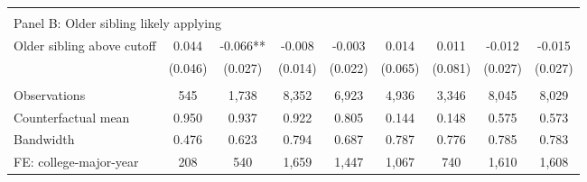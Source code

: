 {{\begin{tabular}{lcccccccc}
&  &  &  & & & & & &    \\
\multicolumn{9}{l}{Panel B: Older sibling likely applying} \\
Older sibling above cutoff&       0.044   &      -0.066** &      -0.008   &      -0.003   &       0.014   &       0.011   &      -0.012   &      -0.015   \\
                    &     (0.046)   &     (0.027)   &     (0.014)   &     (0.022)   &     (0.065)   &     (0.081)   &     (0.027)   &     (0.027)   \\
                    &               &               &               &               &               &               &               &               \\
Observations        &         545   &       1,738   &       8,352   &       6,923   &       4,936   &       3,346   &       8,045   &       8,029   \\
Counterfactual mean &       0.950   &       0.937   &       0.922   &       0.805   &       0.144   &       0.148   &       0.575   &       0.573   \\
Bandwidth           &       0.476   &       0.623   &       0.794   &       0.687   &       0.787   &       0.776   &       0.785   &       0.783   \\
FE: college-major-year&         208   &         540   &       1,659   &       1,447   &       1,067   &         740   &       1,610   &       1,608   \\
 

\bottomrule
\end{tabular}
}
}
